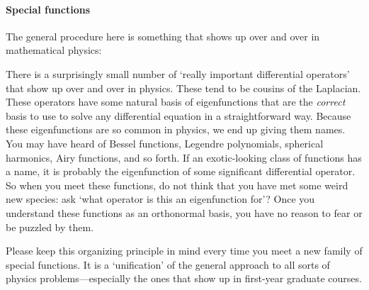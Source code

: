 \documentclass[12pt, oneside]{report}    %
\begin{document}
\paragraph{Special functions} The general procedure here is something that shows up over and over in mathematical physics:
\begin{bigidea}\label{rule:special:functions}
There is a surprisingly small number of `really important differential operators' that show up over and over in physics. These tend to be cousins of the Laplacian. These operators have some natural basis of eigenfunctions that are the \emph{correct} basis to use to solve any differential equation in a straightforward way. Because these eigenfunctions are so common in physics, we end up giving them names. You may have heard of Bessel functions, Legendre polynomials, spherical harmonics, Airy functions, and so forth. If an exotic-looking class of functions has a name, it is probably the eigenfunction of some significant differential operator. So when you meet these functions, do not think that you have met some weird new species: ask `what operator is this an eigenfunction for'? Once you understand these functions as an orthonormal basis, you have no reason to fear or be puzzled by them. 
\end{bigidea}
Please keep this organizing principle in mind every time you meet a new family of special functions. It is a `unification' of the general approach to all sorts of physics problems---especially the ones that show up in first-year graduate courses. 
\end{document}
